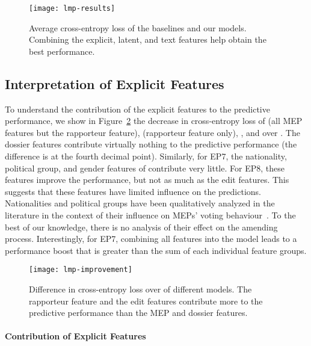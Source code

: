\begin{figure}
  \centering
  \texttt{[image: lmp-results]}
	\caption{%
		Average cross-entropy loss of the baselines and our models.
		Combining the explicit, latent, and text features help obtain the best performance.
	}
	\label{fig:results}
\end{figure}

\subsection{Interpretation of Explicit Features}

To understand the contribution of the explicit features to the predictive performance, we show in Figure~\ref{fig:improvement} the decrease in cross-entropy loss of  (all MEP features but the rapporteur feature),  (rapporteur feature only), , and  over \wow.
The dossier features contribute virtually nothing to the predictive performance (the difference is at the fourth decimal point).
Similarly, for EP7, the nationality, political group, and gender features of  contribute very little.
For EP8, these features improve the performance, but not as much as the edit features.
This suggests that these features have limited influence on the predictions.
Nationalities and political groups have been qualitatively analyzed in the literature in the context of their influence on MEPs' voting behaviour~\cite{hix2002parliamentary,coman2009reassessing,muhlbock2012national,lefkofridi2014multilevel}.
To the best of our knowledge, there is no analysis of their effect on the amending process.
Interestingly, for EP7, combining all features into the  model leads to a performance boost that is greater than the sum of each individual feature groups.

\begin{figure}
  \centering
  \texttt{[image: lmp-improvement]}
	\caption{%
		Difference in cross-entropy loss over \wow{} of different models.
		The rapporteur feature and the edit features contribute more to the predictive performance than the MEP and dossier features.
	}
	\label{fig:improvement}
\end{figure}

\paragraph{Contribution of Explicit Features}

